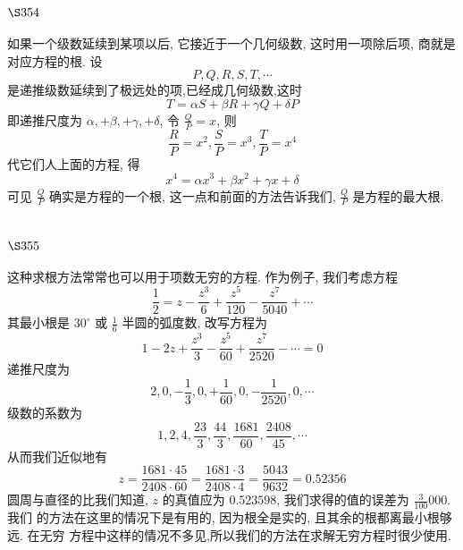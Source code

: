 \section{$\S 354$}

如果一个级数延续到某项以后, 它接近于一个几何级数, 这时用一项除后项, 商就是 对应方程的根. 设
\[
P, Q, R, S, T, \cdots
\]
是递推级数延续到了极远处的项,已经成几何级数,这时
\[
T=\alpha S+\beta R+\gamma Q+\delta P
\]
即递推尺度为 $\alpha,+\beta,+\gamma,+\delta$, 令 $\frac{Q}{P}=x$, 则
\[
\frac{R}{P}=x^{2}, \frac{S}{P}=x^{3}, \frac{T}{P}=x^{4}
\]
代它们人上面的方程, 得
\[
x^{4}=\alpha x^{3}+\beta x^{2}+\gamma x+\delta
\]
可见 $\frac{Q}{P}$ 确实是方程的一个根, 这一点和前面的方法告诉我们, $\frac{Q}{P}$ 是方程的最大根.

\section{$\S 355$}

这种求根方法常常也可以用于项数无穷的方程. 作为例子, 我们考虑方程
\[
\frac{1}{2}=z-\frac{z^{3}}{6}+\frac{z^{5}}{120}-\frac{z^{7}}{5040}+\cdots
\]
其最小根是 $30^{\circ}$ 或 $\frac{1}{6}$ 半圆的弧度数, 改写方程为 
\[
 1-2 z+\frac{z^{3}}{3}-\frac{z^{5}}{60}+\frac{z^{7}}{2520}-\cdots=0
\]
递推尺度为
\[
2,0,-\frac{1}{3}, 0,+\frac{1}{60}, 0,-\frac{1}{2520}, 0, \cdots
\]
级数的系数为
\[
1,2,4, \frac{23}{3}, \frac{44}{3}, \frac{1681}{60}, \frac{2408}{45}, \cdots
\]
从而我们近似地有
\[
z=\frac{1681 \cdot 45}{2408 \cdot 60}=\frac{1681 \cdot 3}{2408 \cdot 4}=\frac{5043}{9632}=0.52356
\]
圆周与直径的比我们知道, $z$ 的真值应为 $0.523598$, 我们求得的值的误差为 $\frac{3}{100} 000$. 我们 的方法在这里的情况下是有用的, 因为根全是实的, 且其余的根都离最小根够远. 在无穷 方程中这样的情况不多见,所以我们的方法在求解无穷方程时很少使用. 

